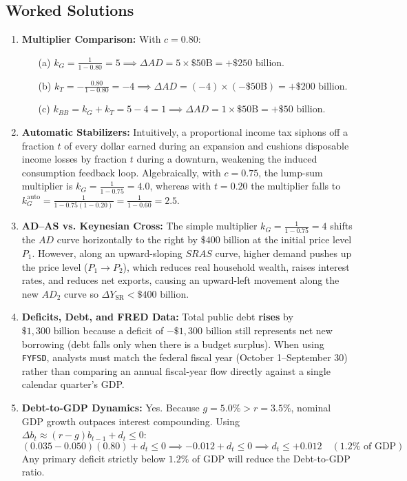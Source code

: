 \documentclass[11pt,letterpaper]{article}
\begin{document}
\subsection*{Worked Solutions}
\begin{enumerate}
    \item \textbf{Multiplier Comparison:} With $c = 0.80$:
    \begin{itemize}
        \item[(a)] $k_G = \frac{1}{1 - 0.80} = 5 \implies \Delta AD = 5 \times \$50\text{B} = +\$250\text{ billion}$.
        \item[(b)] $k_T = -\frac{0.80}{1 - 0.80} = -4 \implies \Delta AD = (-4) \times (-\$50\text{B}) = +\$200\text{ billion}$.
        \item[(c)] $k_{BB} = k_G + k_T = 5 - 4 = 1 \implies \Delta AD = 1 \times \$50\text{B} = +\$50\text{ billion}$.
    \end{itemize}
    \item \textbf{Automatic Stabilizers:} Intuitively, a proportional income tax siphons off a fraction $t$ of every dollar earned during an expansion and cushions disposable income losses by fraction $t$ during a downturn, weakening the induced consumption feedback loop. Algebraically, with $c = 0.75$, the lump-sum multiplier is $k_G = \frac{1}{1 - 0.75} = 4.0$, whereas with $t = 0.20$ the multiplier falls to $k_G^{\text{auto}} = \frac{1}{1 - 0.75(1 - 0.20)} = \frac{1}{1 - 0.60} = 2.5$.
    \item \textbf{AD--AS vs. Keynesian Cross:} The simple multiplier $k_G = \frac{1}{1 - 0.75} = 4$ shifts the $AD$ curve horizontally to the right by $\$400\text{ billion}$ at the initial price level $P_1$. However, along an upward-sloping $SRAS$ curve, higher demand pushes up the price level ($P_1 \rightarrow P_2$), which reduces real household wealth, raises interest rates, and reduces net exports, causing an upward-left movement along the new $AD_2$ curve so $\Delta Y_{\text{SR}} < \$400\text{ billion}$.
    \item \textbf{Deficits, Debt, and FRED Data:} Total public debt \textbf{rises} by $\$1{,}300\text{ billion}$ because a deficit of $-\$1{,}300\text{ billion}$ still represents net new borrowing (debt falls only when there is a budget surplus). When using \texttt{FYFSD}, analysts must match the federal fiscal year (October 1--September 30) rather than comparing an annual fiscal-year flow directly against a single calendar quarter's GDP.
    \item \textbf{Debt-to-GDP Dynamics:} Yes. Because $g = 5.0\% > r = 3.5\%$, nominal GDP growth outpaces interest compounding. Using $\Delta b_t \approx (r - g)b_{t-1} + d_t \le 0$:
    \[
    (0.035 - 0.050)(0.80) + d_t \le 0 \implies -0.012 + d_t \le 0 \implies d_t \le +0.012 \quad (1.2\% \text{ of GDP})
    \]
    Any primary deficit strictly below $1.2\%$ of GDP will reduce the Debt-to-GDP ratio.
\end{enumerate}
\end{document}
